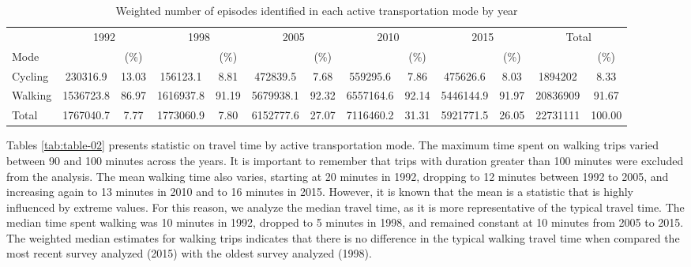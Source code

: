 \documentclass[preprint, 3p,
authoryear]{elsarticle} %
\begin{document}
\begingroup\fontsize{8}{10}\selectfont

\begin{longtable}[t]{lcccccccccccc}
\caption{\label{tab:bulding table-01}\label{tab:episodes-count-percentages}Weighted number of episodes identified in each active transportation mode by year}\\
\toprule
\multicolumn{1}{c}{ } & \multicolumn{2}{c}{1992} & \multicolumn{2}{c}{1998} & \multicolumn{2}{c}{2005} & \multicolumn{2}{c}{2010} & \multicolumn{2}{c}{2015} & \multicolumn{2}{c}{Total} \\
\cmidrule(l{3pt}r{3pt}){2-3} \cmidrule(l{3pt}r{3pt}){4-5} \cmidrule(l{3pt}r{3pt}){6-7} \cmidrule(l{3pt}r{3pt}){8-9} \cmidrule(l{3pt}r{3pt}){10-11} \cmidrule(l{3pt}r{3pt}){12-13}
Mode &  & (\%) &  & (\%) &  & (\%) &  & (\%) &  & (\%) &  & (\%)\\
\midrule
Cycling & 230316.9 & 13.03 & 156123.1 & 8.81 & 472839.5 & 7.68 & 559295.6 & 7.86 & 475626.6 & 8.03 & 1894202 & 8.33\\
Walking & 1536723.8 & 86.97 & 1616937.8 & 91.19 & 5679938.1 & 92.32 & 6557164.6 & 92.14 & 5446144.9 & 91.97 & 20836909 & 91.67\\
Total & 1767040.7 & 7.77 & 1773060.9 & 7.80 & 6152777.6 & 27.07 & 7116460.2 & 31.31 & 5921771.5 & 26.05 & 22731111 & 100.00\\
\bottomrule
\end{longtable}
\endgroup{}

Tables \ref{tab:table-02} presents statistic on travel time by active
transportation mode. The maximum time spent on walking trips varied
between 90 and 100 minutes across the years. It is important to remember
that trips with duration greater than 100 minutes were excluded from the
analysis. The mean walking time also varies, starting at 20 minutes in
1992, dropping to 12 minutes between 1992 to 2005, and increasing again
to 13 minutes in 2010 and to 16 minutes in 2015. However, it is known
that the mean is a statistic that is highly influenced by extreme
values. For this reason, we analyze the median travel time, as it is
more representative of the typical travel time. The median time spent
walking was 10 minutes in 1992, dropped to 5 minutes in 1998, and
remained constant at 10 minutes from 2005 to 2015. The weighted median
estimates for walking trips indicates that there is no difference in the
typical walking travel time when compared the most recent survey
analyzed (2015) with the oldest survey analyzed (1998).

\begingroup\fontsize{8}{10}\selectfont
\end{document}
